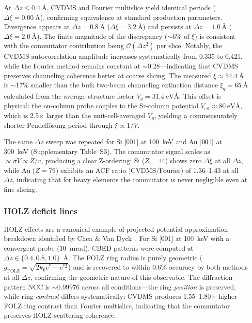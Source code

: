 \documentclass[twoside,11pt]{article}
\begin{document}
At $\Delta z\le\SI{0.4}{\angstrom}$, CVDMS and Fourier multislice yield identical periods ($\Delta\xi=\SI{0.00}{\angstrom}$), confirming equivalence at standard production parameters. Divergence appears at $\Delta z=\SI{0.8}{\angstrom}$ ($\Delta\xi=\SI{3.2}{\angstrom}$) and persists at $\Delta z=\SI{1.0}{\angstrom}$ ($\Delta\xi=\SI{2.0}{\angstrom}$). The finite magnitude of the discrepancy ($\sim$6\% of $\xi$) is consistent with the commutator contribution being $\mathcal O(\Delta z^2)$ per slice. Notably, the CVDMS autocorrelation amplitude increases systematically from 0.335 to 0.421, while the Fourier method remains constant at $\sim$0.28---indicating that CVDMS preserves channeling coherence better at coarse slicing. The measured $\xi\approx\SI{54.4}{\angstrom}$ is $\sim$17\% smaller than the bulk two-beam channeling extinction distance $\xi_g=\SI{65}{\angstrom}$ calculated from the average structure factor $V_g=\SI{31.4}{\electronvolt\angstrom}$. This offset is physical: the on-column probe couples to the Sr-column potential $V_\text{eff}\approx\SI{80}{\electronvolt\angstrom}$, which is 2.5$\times$ larger than the unit-cell-averaged $V_g$, yielding a commensurately shorter Pendell\"osung period through $\xi\propto1/V$.

The same $\Delta z$ sweep was repeated for Si [001] at \SI{100}{\keV} and Au [001] at \SI{300}{\keV} (Supplementary Table~S3). The commutator signal scales as $\propto\sigma V\propto Z/v$, producing a clear Z-ordering: Si ($Z=14$) shows zero $\Delta\xi$ at all $\Delta z$, while Au ($Z=79$) exhibits an ACF ratio (CVDMS/Fourier) of 1.36--1.43 at all $\Delta z$, indicating that for heavy elements the commutator is never negligible even at fine slicing.


\subsubsection{HOLZ deficit lines}

HOLZ effects are a canonical example of projected-potential approximation breakdown identified by Chen \& Van Dyck~\cite{ChenVanDyck1997}. For Si [001] at \SI{100}{\keV} with a convergent probe (10~mrad), CBED patterns were computed at $\Delta z\in\{0.4,0.8,1.0\}$~\AA. The FOLZ ring radius is purely geometric ($g_\text{FOLZ}=\sqrt{2k_0c^*-c^{*2}}$) and is recovered to within 0.6\% accuracy by both methods at all $\Delta z$, confirming the geometric nature of this observable. The diffraction pattern NCC is $\sim$0.99976 across all conditions---the ring \textit{position} is preserved, while ring \textit{contrast} differs systematically: CVDMS produces 1.55--1.80$\times$ higher FOLZ ring contrast than Fourier multislice, indicating that the commutator preserves HOLZ scattering coherence.
\end{document}
